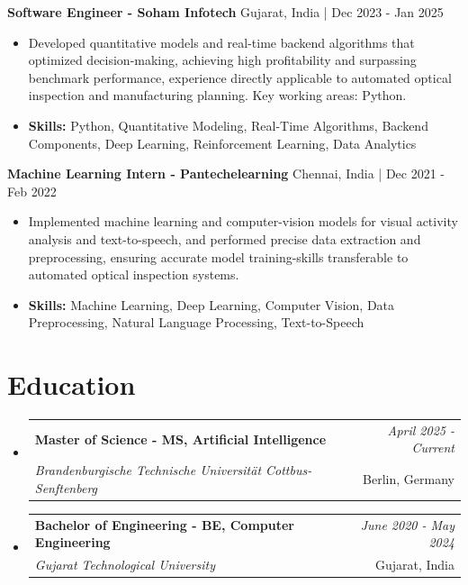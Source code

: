 \documentclass[a4paper,11pt]{article}
\makeatletter
\newcommand{\resumeSubheading}[4]{
\vspace{0.5mm}\item
    \begin{tabular*}{\linewidth}[t]{l@{\extracolsep{\fill}}r}
        \textbf{#1} & \textit{\footnotesize{#4}} \\
        \textit{\footnotesize{#3}} &  \footnotesize{#2}\\
    \end{tabular*}
    \vspace{-2.4mm}
}
\makeatother
\begin{document}
\vspace{1mm}
  \textbf{Software Engineer - Soham Infotech} \hfill Gujarat, India | Dec 2023 - Jan 2025
\vspace{-1.5mm} %
\begin{itemize}
  \item Developed quantitative models and real-time backend algorithms that optimized decision-making, achieving high profitability and surpassing benchmark performance, experience directly applicable to automated optical inspection and manufacturing planning. Key working areas: Python.

\vspace{-2mm}
  \item \textbf{Skills:} Python, Quantitative Modeling, Real-Time Algorithms, Backend Components, Deep Learning, Reinforcement Learning, Data Analytics
\end{itemize}

\vspace{1mm}
  \textbf{Machine Learning Intern - Pantechelearning} \hfill Chennai, India | Dec 2021 - Feb 2022
\vspace{-1.5mm} %
\begin{itemize}
  \item Implemented machine learning and computer-vision models for visual activity analysis and text-to-speech, and performed precise data extraction and preprocessing, ensuring accurate model training-skills transferable to automated optical inspection systems.
\vspace{-2mm}
  \item \textbf{Skills:} Machine Learning, Deep Learning, Computer Vision, Data Preprocessing, Natural Language Processing, Text-to-Speech
\end{itemize}\section{\textbf{Education}}
\vspace{-0.4mm}

\begin{itemize}[leftmargin=0.15in, label={}]
\resumeSubheading
{Master of Science - MS, Artificial Intelligence }{Berlin, Germany}
{Brandenburgische Technische Universität Cottbus-Senftenberg  }{April 2025 - Current}

\vspace{1.0mm} %
\resumeSubheading
{Bachelor of Engineering - BE, Computer Engineering  }{Gujarat, India}
{Gujarat Technological University }{June 2020 - May 2024}

\end{itemize}
\end{document}
